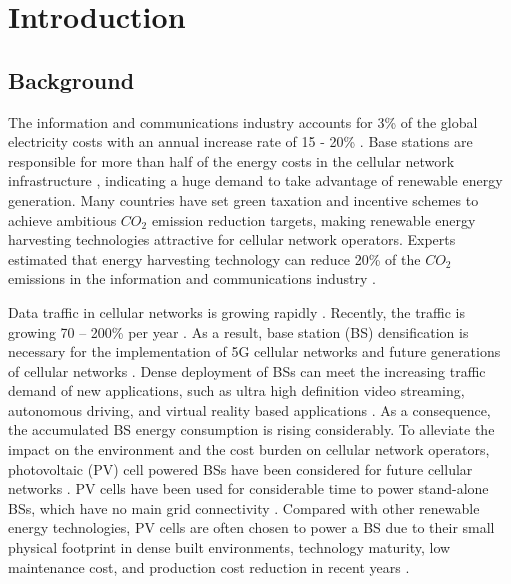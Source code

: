 \clearpage
{}

\chapter{Introduction\label{Introduction}}


\section{Background\label{back}} 
The information and communications industry accounts for 3\% of the global electricity costs with an annual increase rate of 15 - 20\% \cite{green}. Base stations are responsible for more than half of the energy costs in the cellular network infrastructure \cite{residential}, indicating a huge demand to take advantage of renewable energy generation. Many countries have set green taxation and incentive schemes to achieve ambitious $CO_2$ emission reduction targets, making renewable energy harvesting technologies attractive for cellular network operators. Experts estimated that energy harvesting technology can reduce 20\% of the $CO_2$ emissions in the information and communications industry \cite{white_energy}.


Data traffic in cellular networks is growing rapidly \cite{7063493}. Recently, the traffic is growing 70 – 200\% per year \cite{wifi}.
As a result, base station (BS) densification is necessary for the implementation of 5G cellular networks and future generations of cellular networks \cite{SamarakoonSumudu2016UDSC}.
Dense deployment of BSs can meet the increasing traffic demand of new applications, such as ultra high definition video streaming, autonomous driving, and virtual reality based applications \cite{HetNets}. As a consequence, the accumulated BS energy consumption is rising considerably. To alleviate the impact on the environment and the cost burden on cellular network operators, photovoltaic (PV) cell powered BSs have been considered for future cellular networks \cite{residential, white_energy, Wang2015}. PV cells have been used for considerable time to power stand-alone BSs, which have no main grid connectivity \cite{NemaPragya2010Mogh}.
Compared with other renewable energy technologies, PV cells are often chosen to power a BS due to their small physical footprint in dense built environments, technology maturity, low maintenance cost, and production cost reduction in recent years \cite{white_energy}. 



